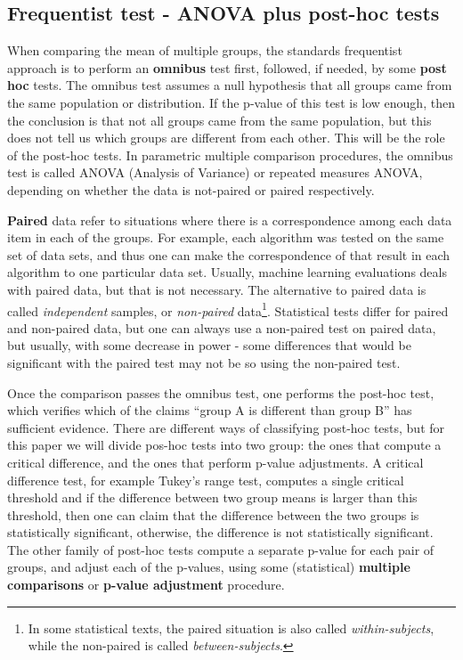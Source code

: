 \documentclass[twoside,11pt,preprint]{article}
\begin{document}
\hypertarget{frequentist-test---anova-plus-post-hoc-tests}{%
\subsection{\texorpdfstring{Frequentist test - ANOVA plus post-hoc tests \label{sec:tut2}}{Frequentist test - ANOVA plus post-hoc tests }}\label{frequentist-test---anova-plus-post-hoc-tests}}

When comparing the mean of multiple groups, the standards frequentist
approach is to perform an \textbf{omnibus} test first, followed, if needed,
by some \textbf{post hoc} tests. The omnibus test assumes a null
hypothesis that all groups came from the same population or
distribution. If the p-value of this test is low enough, then the
conclusion is that not all groups came from the same population, but
this does not tell us which groups are different from each other. This
will be the role of the post-hoc tests. In parametric multiple
comparison procedures, the omnibus test is called ANOVA (Analysis of
Variance) or repeated measures ANOVA, depending on whether the data is
not-paired or paired respectively.

\textbf{Paired} data refer to situations where there is a correspondence
among each data item in each of the groups. For example, each
algorithm was tested on the same set of data sets, and thus one can
make the correspondence of that result in each algorithm to one
particular data set. Usually, machine learning evaluations deals with
paired data, but that is not necessary. The alternative to paired data
is called \emph{independent} samples, or \emph{non-paired} data\footnote{In
  some statistical texts, the
  paired situation is also called \emph{within-subjects}, while the non-paired
  is called \emph{between-subjects}.}. Statistical tests differ for paired and
non-paired data, but one can always use a non-paired test on paired
data, but usually, with some decrease in power - some differences that
would be significant with the paired test may not be so using the
non-paired test.

Once the comparison passes the omnibus test, one performs the post-hoc
test, which verifies which of the claims ``group A is different than
group B'' has sufficient evidence. There are different ways of
classifying post-hoc tests, but for this paper we will divide pos-hoc tests into two group: the ones that compute a critical difference, and the ones that perform p-value adjustments. A critical difference test, for example Tukey's range test, computes a single critical threshold and if the difference between two group means is
larger than this threshold, then one can claim that the
difference between the two groups is statistically significant,
otherwise, the difference is not statistically significant. The
other family of post-hoc tests compute a separate p-value for each pair of groups, and adjust each of
the p-values, using some (statistical) \textbf{multiple comparisons} or
\textbf{p-value adjustment} procedure.
\end{document}
